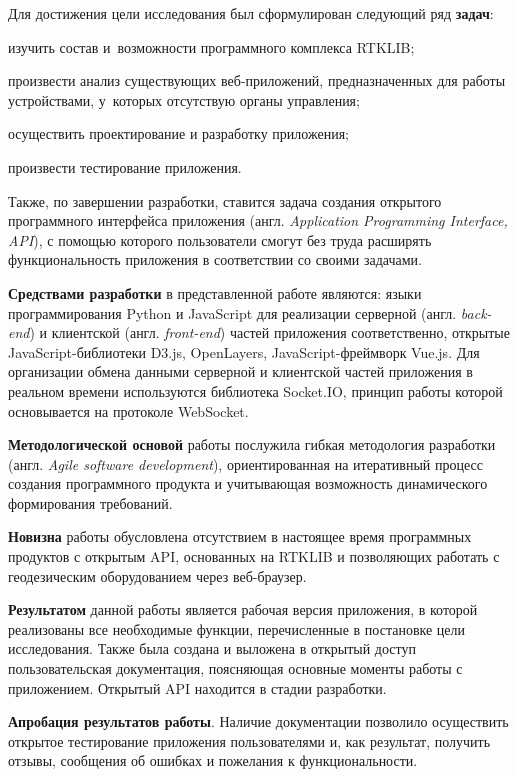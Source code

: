 Для достижения цели исследования был сформулирован следующий ряд \textbf{задач}:

\begin{dashitemize}
  \item изучить состав и~возможности программного комплекса RTKLIB;
  \item произвести анализ существующих веб-приложений, предназначенных для работы устройствами, у~которых отсутствую органы управления;
  \item осуществить проектирование и разработку приложения;
  \item произвести тестирование приложения.
\end{dashitemize}

Также, по завершении разработки, ставится задача создания открытого программного интерфейса приложения (англ. \emph{Application Programming Interface, API}), с помощью которого пользователи смогут без труда расширять функциональность приложения в соответствии со своими задачами. \par

\textbf{Средствами разработки} в представленной работе являются: языки программирования Python и JavaScript для реализации серверной (англ. \emph{back-end}) и клиентской (англ. \emph{front-end}) частей приложения соответственно, открытые JavaScript-библиотеки D3.js, OpenLayers, JavaScript-фреймворк Vue.js. Для организации обмена данными серверной и клиентской частей приложения в реальном времени используются библиотека Socket.IO, принцип работы которой основывается на протоколе WebSocket. \par

\textbf{Методологической основой} работы послужила гибкая методология разработки (англ. \emph{Agile software development}), ориентированная на итеративный процесс создания программного продукта и учитывающая возможность динамического формирования требований. \par

\textbf{Новизна} работы обусловлена отсутствием в настоящее время программных продуктов с открытым API, основанных на RTKLIB и позволяющих работать с геодезическим оборудованием через веб-браузер. \par

\textbf{Результатом} данной работы является рабочая версия приложения, в которой реализованы все необходимые функции, перечисленные в постановке цели исследования. Также была создана и выложена в открытый доступ пользовательская документация, поясняющая основные моменты работы с приложением. Открытый API находится в стадии разработки. \par

\textbf{Апробация результатов работы}. Наличие документации позволило осуществить открытое тестирование приложения пользователями и, как результат, получить отзывы, сообщения об ошибках и пожелания к функциональности. \par

